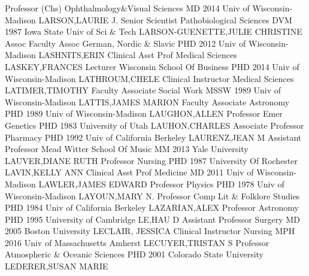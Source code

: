 \documentclass[
]{article}
\begin{document}
Professor (Chs) \textbar Ophthalmology\&Visual Sciences \textbar{}
 \textbar MD 2014 Univ of Wisconsin-Madison
\textbar LARSON,LAURIE J. \textbar Senior Scientist
\textbar Pathobiological Sciences \textbar{}  \textbar DVM
1987 Iowa State Univ of Sci \& Tech \textbar LARSON-GUENETTE,JULIE
CHRISTINE \textbar Assoc Faculty Assoc \textbar German, Nordic \& Slavic
\textbar{}  \textbar PHD 2012 Univ of Wisconsin-Madison
\textbar LASHNITS,ERIN \textbar Clinical Asst Prof \textbar Medical
Sciences \textbar{}  \textbar LASKEY,FRANCES
\textbar Lecturer \textbar Wisconsin School Of Business \textbar PHD
2014 Univ of Wisconsin-Madison \textbar{} 
\textbar LATHROUM,CHELE \textbar Clinical Instructor \textbar Medical
Sciences \textbar LATIMER,TIMOTHY \textbar{} 
\textbar Faculty Associate \textbar Social Work \textbar MSSW 1989 Univ
of Wisconsin-Madison \textbar LATTIS,JAMES MARION \textbar{}
 \textbar Faculty Associate \textbar Astronomy \textbar PHD
1989 Univ of Wisconsin-Madison \textbar LAUGHON,ALLEN \textbar{}
 \textbar Professor Emer \textbar Genetics \textbar PHD 1983
University of Utah \textbar LAUHON,CHARLES \textbar{} 
\textbar Associate Professor \textbar Pharmacy \textbar PHD 1992 Univ of
California Berkeley \textbar LAURENZ,JEAN M \textbar{} 
\textbar Assistant Professor \textbar Mead Witter School Of Music
\textbar MM 2013 Yale University \textbar LAUVER,DIANE RUTH \textbar{}
 \textbar Professor \textbar Nursing \textbar PHD 1987
University Of Rochester \textbar LAVIN,KELLY ANN \textbar{} 
\textbar Clinical Asst Prof \textbar Medicine \textbar MD 2011 Univ of
Wisconsin-Madison \textbar LAWLER,JAMES EDWARD \textbar{} 
\textbar Professor \textbar Physics \textbar PHD 1978 Univ of
Wisconsin-Madison \textbar LAYOUN,MARY N. \textbar{} 
\textbar Professor \textbar Comp Lit \& Folklore Studies \textbar PHD
1984 Univ of California Berkeley \textbar LAZARIAN,ALEX \textbar{}
 \textbar Professor \textbar Astronomy \textbar PHD 1995
University of Cambridge \textbar LE,HAU D \textbar{} 
\textbar Assistant Professor \textbar Surgery \textbar MD 2005 Boston
University \textbar LECLAIR, JESSICA \textbar{} 
\textbar Clinical Instructor \textbar Nursing \textbar MPH 2016 Univ of
Massachusetts Amherst \textbar LECUYER,TRISTAN S \textbar{} 
\textbar Professor \textbar Atmospheric \& Oceanic Sciences \textbar PHD
2001 Colorado State University \textbar LEDERER,SUSAN MARIE \textbar{}
\end{document}
